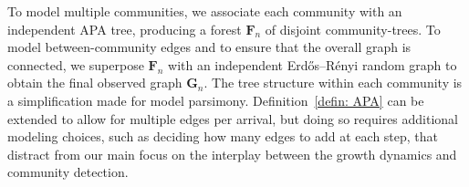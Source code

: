 \documentclass[twoside,11pt]{article}
\newtheorem{defin}[theorem]{Definition}
\theoremstyle{remark}
\begin{document}
To model multiple communities, we associate each community with an independent APA tree, producing a forest $\bm{F}_n$ of disjoint community-trees. To model between-community edges and to ensure that the overall graph is connected, we superpose $\bm{F}_n$ with an independent Erd\H{o}s--R\'enyi random graph to obtain the final observed graph $\bm{G}_n$. The tree structure within each community is a simplification made for model parsimony. Definition~\ref{defin: APA} can be extended to allow for multiple edges per arrival, but doing so requires additional modeling choices, such as deciding how many edges to add at each step, that distract from our main focus on the interplay between the growth dynamics and community detection. 



\end{document}
